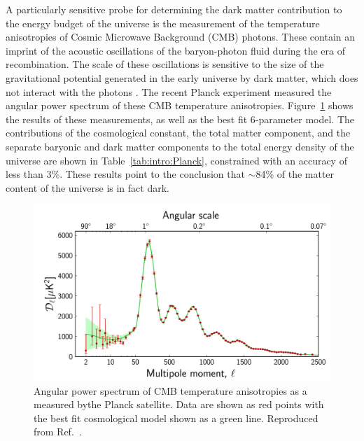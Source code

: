 


A particularly sensitive probe for determining the dark matter contribution to the energy budget of the universe is the measurement of the temperature anisotropies of Cosmic Microwave Background (CMB) photons. These contain an imprint of the acoustic oscillations of the baryon-photon fluid during the era of recombination. The scale of these oscillations is sensitive to the size of the gravitational potential generated in the early universe by dark matter, which does not interact with the photons \cite{Kolb:1990}. The recent Planck experiment \cite{PlanckI:2013} measured the angular power spectrum of these CMB temperature anisotropies. Figure~\ref{fig:intro:CMB} shows the results of these measurements, as well as the best fit 6-parameter \LCDM model. The contributions of the cosmological constant, the total matter component, and the separate baryonic and dark matter components to the total energy density of the universe are shown in Table~\ref{tab:intro:Planck}, constrained with an accuracy of less than 3\%. These results point to the conclusion that $\sim$84\% of the matter content of the universe is in fact dark.



\begin{figure}[h]

  \includegraphics[width=\textwidth]{CMBanisotropies.jpg}
  \caption[CMB anisotropies measured by the Planck experiment]{Angular power spectrum of CMB temperature anisotropies as a measured bythe Planck satellite. Data are shown as red points with the best fit \LCDM cosmological model shown as a green line. Reproduced from Ref.~\cite{PlanckI:2013}.}
  \label{fig:intro:CMB}
\end{figure}


